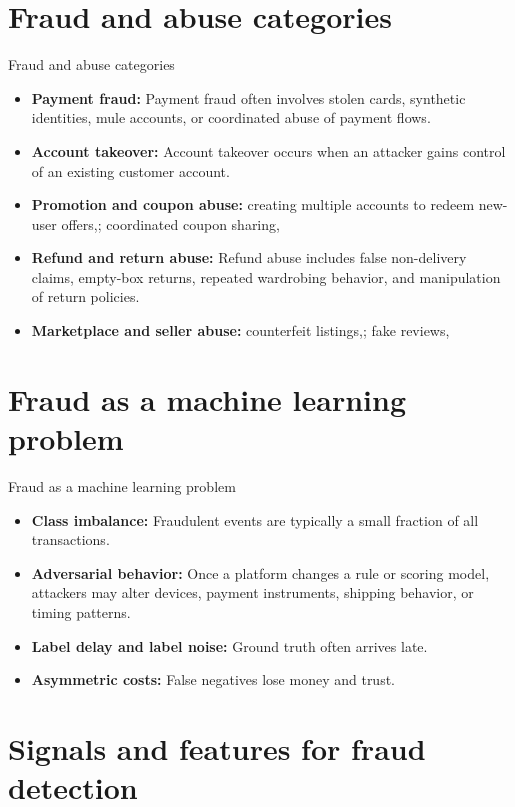 \documentclass[aspectratio=169]{beamer}
\begin{document}
\section{Fraud and abuse categories}

\begin{frame}{Fraud and abuse categories}
  \begin{itemize}
    \item \textbf{Payment fraud:} Payment fraud often involves stolen cards, synthetic identities, mule accounts, or coordinated abuse of payment flows.
    \item \textbf{Account takeover:} Account takeover occurs when an attacker gains control of an existing customer account.
    \item \textbf{Promotion and coupon abuse:} creating multiple accounts to redeem new-user offers,; coordinated coupon sharing,
    \item \textbf{Refund and return abuse:} Refund abuse includes false non-delivery claims, empty-box returns, repeated wardrobing behavior, and manipulation of return policies.
    \item \textbf{Marketplace and seller abuse:} counterfeit listings,; fake reviews,
  \end{itemize}
\end{frame}

\section{Fraud as a machine learning problem}

\begin{frame}{Fraud as a machine learning problem}
  \begin{itemize}
    \item \textbf{Class imbalance:} Fraudulent events are typically a small fraction of all transactions.
    \item \textbf{Adversarial behavior:} Once a platform changes a rule or scoring model, attackers may alter devices, payment instruments, shipping behavior, or timing patterns.
    \item \textbf{Label delay and label noise:} Ground truth often arrives late.
    \item \textbf{Asymmetric costs:} False negatives lose money and trust.
  \end{itemize}
\end{frame}

\section{Signals and features for fraud detection}
\end{document}
